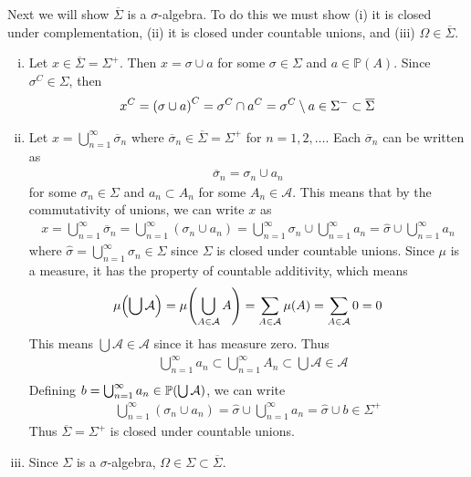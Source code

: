 \documentclass[12pt]{article}
\theoremstyle{plain}
\begin{document}
Next we will show $\overline{\Sigma}$ is a $\sigma$-algebra.  To do this we must show (i) it is closed under complementation, (ii) it is closed under countable unions, and (iii) $\Omega \in \overline{\Sigma}$.
\begin{enumerate}[(i)]
    \item
        Let $x \in \overline{\Sigma} = \Sigma^+$.  Then $x = \sigma \cup a$ for some $\sigma \in \Sigma$ and $a \in \mathbb{P}(A)$.  Since $\sigma^C \in \Sigma$, then
        \begin{align*}
            x^C = \qty(\sigma \cup a)^C = \sigma^C \cap a^C = \sigma^C \setminus a \in \Sigma^- \subset \overline{\Sigma}
        \end{align*}
    \item
        Let $x = \bigcup_{n=1}^\infty \overline{\sigma}_n$ where $\overline{\sigma}_n \in \overline{\Sigma} =\Sigma^+$ for $n = 1, 2, \dots$.  Each $\overline{\sigma}_n$ can be written as
        \begin{align*}
            \overline{\sigma}_n = \sigma_n \cup a_n
        \end{align*}
        for some $\sigma_n \in \Sigma$ and $a_n \subset A_n$ for some $A_n \in \mathcal{A}$.  This means that by the commutativity of unions, we can write $x$ as
        \begin{align*}
            x = \bigcup_{n=1}^\infty \overline{\sigma}_n = \bigcup_{n=1}^\infty (\sigma_n \cup a_n) = \bigcup_{n=1}^\infty \sigma_n \cup \bigcup_{n=1}^\infty a_n = \hat{\sigma} \cup \bigcup_{n=1}^\infty a_n
        \end{align*}
        where $\hat{\sigma} = \bigcup_{n=1}^\infty \sigma_n \in \Sigma$ since $\Sigma$ is closed under countable unions.  Since $\mu$ is a measure, it has the property of countable additivity, which means
        \begin{align*}
            \mu\qty(\bigcup \mathcal{A}) = \mu\qty(\bigcup_{A\in\mathcal{A}}A) = \sum_{A\in \mathcal{A}}\mu(A) = \sum_{A\in\mathcal{A}}0 = 0
        \end{align*}
        This means $\bigcup \mathcal{A} \in \mathcal{A}$ since it has measure zero.  Thus
        \begin{align*}
            &\bigcup_{n=1}^\infty a_n \subset \bigcup_{n=1}^\infty A_n \subset \bigcup \mathcal{A} \in \mathcal{A} \\
        \end{align*}
        Defining $b = \bigcup_{n=1}^\infty a_n \in \mathbb{P}\qty(\bigcup\mathcal{A})$, we can write
        \begin{align*}
            \bigcup_{n=1}^\infty (\sigma_n \cup a_n) = \hat{\sigma} \cup \bigcup_{n=1}^\infty a_n = \hat{\sigma} \cup b \in \Sigma^+
        \end{align*}
        Thus $\overline{\Sigma} = \Sigma^+$ is closed under countable unions.
    \item
        Since $\Sigma$ is a $\sigma$-algebra, $\Omega \in \Sigma \subset \overline{\Sigma}$.
\end{enumerate}
\end{document}
